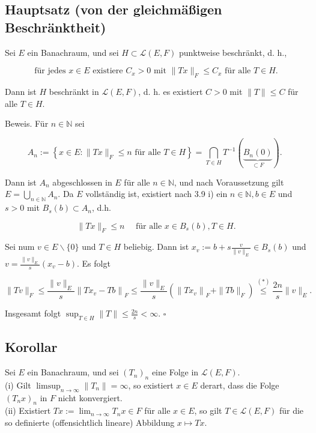 \documentclass[10pt, letterpaper]{article}
\begin{document}
\subsection*{Hauptsatz (von der gleichmäßigen Beschränktheit)}
Sei $E$ ein Banachraum, und sei $H \subset \mathcal{L}(E, F)$ punktweise beschränkt, d. h.,

$$
\text { für jedes } x \in E \text { existiere } C_{x}>0 \text { mit }\|T x\|_{F} \leq C_{x} \text { für alle } T \in H \text {. }
$$

Dann ist $H$ beschränkt in $\mathcal{L}(E, F)$, d. h. es existiert $C>0$ mit $\|T\| \leq C$ für alle $T \in H$.

Beweis. Für $n \in \mathbb{N}$ sei

$$
A_{n}:=\left\{x \in E:\|T x\|_{F} \leq n \text { für alle } T \in H\right\}=\bigcap_{T \in H} T^{-1}(\underbrace{B_{n}(0)}_{\subset F}) \text {. }
$$

Dann ist $A_{n}$ abgeschlossen in $E$ für alle $n \in \mathbb{N}$, und nach Voraussetzung gilt $E= \bigcup_{n \in \mathbb{N}} A_{n}$. Da $E$ vollständig ist, existiert nach 3.9 i) ein $n \in \mathbb{N}, b \in E$ und $s>0$ mit $B_{s}(b) \subset A_{n}$, d.h.

$$
\|T x\|_{F} \leq n \quad \text { für alle } x \in B_{s}(b), T \in H .
$$

Sei num $v \in E \backslash\{0\}$ und $T \in H$ beliebig. Dann ist $x_{v}:=b+s \frac{v}{\|v\|_{E}} \in B_{s}(b)$ und $v=\frac{\|v\|_{E}}{s}\left(x_{v}-b\right)$. Es folgt

$$
\|T v\|_{F} \leq \frac{\|v\|_{E}}{s}\left\|T x_{v}-T b\right\|_{F} \leq \frac{\|v\|_{E}}{s}\left(\left\|T x_{v}\right\|_{F}+\|T b\|_{F}\right) \stackrel{(*)}{\leq} \frac{2 n}{s}\|v\|_{E} .
$$

Insgesamt folgt $\sup _{T \in H}\|T\| \leq \frac{2 n}{s}<\infty$. \(\square\)

\subsection*{Korollar}
Sei $E$ ein Banachraum, und sei $\left(T_{n}\right)_{n}$ eine Folge in $\mathcal{L}(E, F)$.\\
(i) Gilt $\limsup _{n \rightarrow \infty}\left\|T_{n}\right\|=\infty$, so existiert $x \in E$ derart, dass die Folge $\left(T_{n} x\right)_{n}$ in $F$ nicht konvergiert.\\
(ii) Existiert $T x:=\lim _{n \rightarrow \infty} T_{n} x \in F$ für alle $x \in E$, so gilt $T \in \mathcal{L}(E, F)$ für die so definierte (offensichtlich lineare) Abbildung $x \mapsto T x$.
\end{document}
